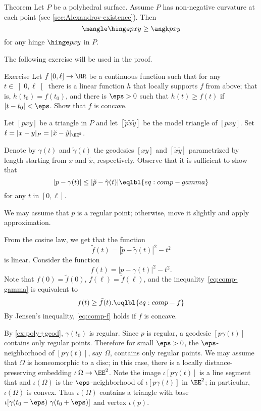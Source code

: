 \begin{thm}{Theorem}\label{thm:poly-cbb}
Let $P$ be a polyhedral surface.
Assume $P$ has non-negative curvature at each point (see \ref{sec:Alexandrov-existence}).
Then 
\[\mangle\hinge pxy\ge\angk pxy\]
for any hinge $\hinge pxy$ in $P$.
\end{thm}

The following exercise will be used in the proof.

\begin{thm}{Exercise}\label{ex:concave-loc}
Let $f\:[0,\ell]\to\RR$ be a continuous function such that for any $t\in \left]0,\ell\right[$ there is a linear function $h$ that locally supports $f$ from above;
that is, $h(t_0)=f(t_0)$, and there is $\eps>0$ such that $h(t)\ge f(t)$ if $|t-t_0|<\eps$.
Show that $f$ is concave.
\end{thm}


Let $[pxy]$ be a triangle in $P$ and let $[\tilde p\tilde x\tilde y]$ be the model triangle of $[pxy]$.
Set $\ell=|x-y|_P=|\tilde x-\tilde y|_{\EE^2}$.

Denote by $\gamma(t)$ and $\tilde \gamma(t)$ the geodesics $[xy]$ and $[\tilde x\tilde y]$ parametrized by length starting from $x$ and $\tilde x$, respectively.
Observe that it is sufficient to show that 
$$| p- \gamma(t)|\le|\tilde p-\tilde \gamma(t)| 
\eqlbl{eq:comp-gamma}$$
for any $t$ in $[0,\ell]$.

We may assume that $p$ is a regular point;
otherwise, move it slightly and apply approximation.


From the cosine law, we get that the function 
$$\tilde f(t)=|\tilde p-\tilde \gamma(t)|^2-t^2$$
is linear.
Consider the function
$$f(t)=|p- \gamma(t)|^2-t^2.$$
Note that $f(0)=\tilde f(0)$, $f(\ell)=\tilde f(\ell)$, and the inequality~\ref{eq:comp-gamma} is equivalent to
$$f(t)\ge \tilde f(t).
\eqlbl{eq:comp-f}$$
By Jensen's inequality, \ref{eq:comp-f} holds if $f$ is concave.

By \ref{ex:poly+geod}, 
$\gamma(t_0)$ is regular.
Since $p$ is regular,
a geodesic $[p\gamma(t)]$ contains only regular points.
Therefore for small $\eps>0$,
 the $\eps$-neighborhood of $[p\gamma(t)]$, say $\Omega$, contains only regular points. 
We may assume that $\Omega$ is homeomorphic to a disc;
in this case, there is a locally distance-preserving embedding $\iota\:\Omega\to\EE^2$.
Note the image $\iota[p\gamma(t)]$ is a line segment that 
and $\iota(\Omega)$ is the $\eps$-neighborhood of $\iota[p\gamma(t)]$ in $\EE^2$;
in particular, $\iota(\Omega)$ is convex.
Thus $\iota(\Omega)$ contains a triangle with  base $\iota[\gamma(t_0-\eps)\ \gamma(t_0+\eps)]$  and vertex $\iota(p)$.

